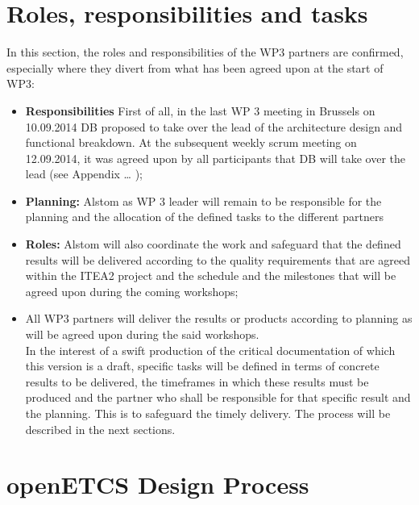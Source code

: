 \section{Roles, responsibilities and tasks}
In this section, the roles and responsibilities of the WP3 partners are confirmed, especially where they divert from what has been agreed upon at the start of WP3:
\begin{itemize}
\item\textbf{Responsibilities} First of all, in the last WP 3 meeting in Brussels on  10.09.2014 DB proposed to take over the lead of the architecture design and functional breakdown. At the subsequent weekly scrum meeting on 12.09.2014,  it was agreed upon by all participants that DB will take over the lead (see Appendix … );\\
\item\textbf{Planning:} Alstom as WP 3 leader will remain to be responsible for the planning and the allocation of the defined tasks to the different partners\\
\item\textbf{Roles:} Alstom will also coordinate the work and safeguard that the defined results will be delivered according to the quality requirements that are agreed within the ITEA2 project and the schedule and the milestones that will be agreed upon during the coming workshops;\\
\item All WP3 partners will deliver the results or products according to planning as will be agreed upon during the said workshops. \\

In the interest of a swift production of the critical documentation of which this version is a draft, specific tasks will be defined in terms of concrete results to be delivered, the timeframes in which these results must be produced and the partner who shall be responsible for that specific result and the planning. This is to safeguard the timely delivery. The process will be described in the next sections.
\end{itemize}






\section{openETCS Design Process}


